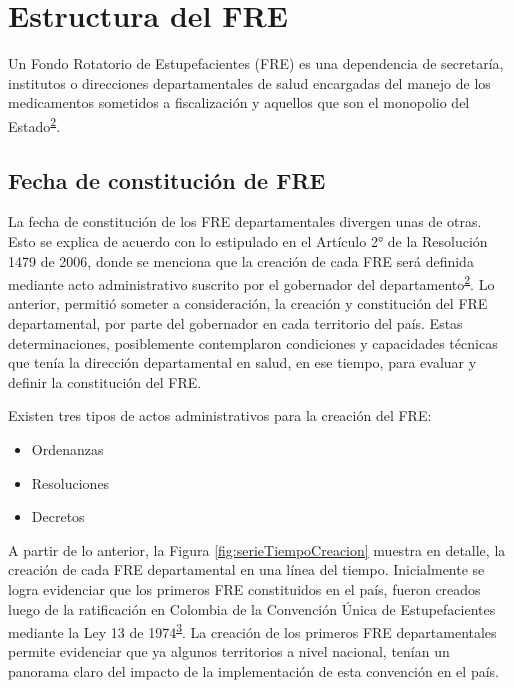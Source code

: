 \documentclass[
  oneside]{book}
\providecommand{\tightlist}{%
  \setlength{\itemsep}{0pt}\setlength{\parskip}{0pt}}
\begin{document}
\hypertarget{estructura-del-fre}{%
\chapter{Estructura del FRE}\label{estructura-del-fre}}


Un Fondo Rotatorio de Estupefacientes (FRE) es una dependencia de secretaría, institutos o direcciones departamentales de salud encargadas del manejo de los medicamentos sometidos a fiscalización y aquellos que son el monopolio del Estado\textsuperscript{\protect\hyperlink{ref-MSPS1479-2006}{2}}.

\hypertarget{fecha-de-constituciuxf3n-de-fre}{%
\section{Fecha de constitución de FRE}\label{fecha-de-constituciuxf3n-de-fre}}

La fecha de constitución de los FRE departamentales divergen unas de otras. Esto se explica de acuerdo con lo estipulado en el Artículo 2° de la Resolución 1479 de 2006, donde se menciona que la creación de cada FRE será definida mediante acto administrativo suscrito por el gobernador del departamento\textsuperscript{\protect\hyperlink{ref-MSPS1479-2006}{2}}. Lo anterior, permitió someter a consideración, la creación y constitución del FRE departamental, por parte del gobernador en cada territorio del país. Estas determinaciones, posiblemente contemplaron condiciones y capacidades técnicas que tenía la dirección departamental en salud, en ese tiempo, para evaluar y definir la constitución del FRE.

Existen tres tipos de actos administrativos para la creación del FRE:

\begin{itemize}
\tightlist
\item
  Ordenanzas
\item
  Resoluciones
\item
  Decretos
\end{itemize}

A partir de lo anterior, la Figura \ref{fig:serieTiempoCreacion} muestra en detalle, la creación de cada FRE departamental en una línea del tiempo. Inicialmente se logra evidenciar que los primeros FRE constituidos en el país, fueron creados luego de la ratificación en Colombia de la Convención Única de Estupefacientes mediante la Ley 13 de 1974\textsuperscript{\protect\hyperlink{ref-CongresodelaRepublica1974}{3}}. La creación de los primeros FRE departamentales permite evidenciar que ya algunos territorios a nivel nacional, tenían un panorama claro del impacto de la implementación de esta convención en el país.
\end{document}
